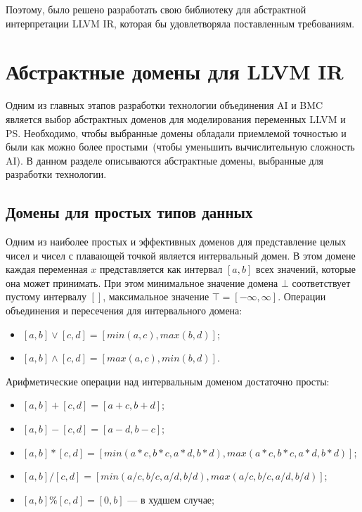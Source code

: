 Поэтому, было решено разработать свою библиотеку для абстрактной интерпретации
LLVM IR, которая бы удовлетворяла поставленным требованиям.

\section{Абстрактные домены для LLVM IR}
\label{section:domains}
Одним из главных этапов разработки технологии объединения AI и BMC является
выбор абстрактных доменов для моделирования переменных LLVM и PS. Необходимо,
чтобы выбранные домены обладали приемлемой точностью и были как можно более
простыми~(чтобы уменьшить вычислительную сложность AI). В данном разделе 
описываются абстрактные домены, выбранные для разработки технологии.

\subsection{Домены для простых типов данных}
Одним из наиболее простых и эффективных доменов для представление целых чисел и
чисел с плавающей точкой является интервальный домен. В этом домене каждая 
переменная $x$ представляется как интервал $[a, b]$ всех значений, которые она 
может принимать. При этом минимальное значение домена $\bot$ соответствует 
пустому интервалу $[]$, максимальное значение $\top = [-\infty, \infty]$. 
Операции объединения и пересечения для интервального домена:
\begin{itemize}
\item $[a, b] \vee [c, d] = [min(a, c), max(b, d)]$;
\item $[a, b] \wedge [c, d] = [max(a, c), min(b, d)]$.
\end{itemize}

Арифметические операции над интервальным доменом достаточно просты:
\begin{itemize}
\item $[a, b] + [c, d] = [a + c, b + d]$;
\item $[a, b] - [c, d] = [a - d, b - c]$;
\item $[a, b] * [c, d] = [min(a * c, b * c, a * d, b * d), max(a * c, b * c,
a * d, b * d)]$;
\item $[a, b] / [c, d] = [min(a / c, b / c, a / d, b / d), max(a / c, b / c,
a / d, b / d)]$;
\item $[a, b] \% [c, d] = [0, b]$ --- в худшем случае;
\end{itemize}

